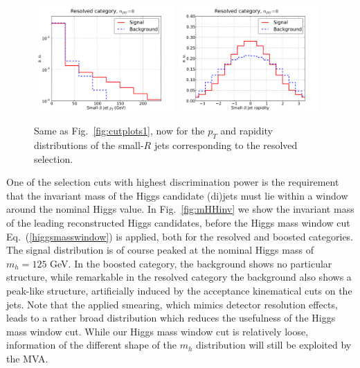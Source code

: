 \begin{figure}[t]
\begin{center}
 \includegraphics[width=0.48\textwidth]{plots/pt_smallRjets_res_noPU.pdf}
 \includegraphics[width=0.48\textwidth]{plots/eta_smallRjets_res_noPU.pdf}
 \caption{\small Same as Fig.~\ref{fig:cutplots1}, now for the
   $p_T$ and rapidity distributions of the small-$R$
   jets corresponding to the resolved selection.
}
\label{fig:cutplots23}
\end{center}
\end{figure}

One of the selection cuts with highest discrimination power is the requirement
that the invariant mass of the Higgs candidate (di)jets must lie within a window
around the nominal Higgs value.
%
In Fig.~\ref{fig:mHHinv} we show the invariant mass
of the leading reconstructed Higgs candidates, before the Higgs mass window
cut Eq.~(\ref{higgsmasswindow})
  is applied, both for the resolved and boosted categories.
%
The signal distribution is of course peaked at the
nominal Higgs mass of $m_h=125$ GeV.
%
In the boosted category, the background shows no particular
structure, while remarkable in the resolved category the background
also shows a peak-like structure, artificially induced by the
acceptance kinematical cuts on the jets.
%
Note that the applied smearing, which mimics detector resolution effects,
leads to a rather broad distribution which reduces the usefulness
of the Higgs mass window cut.
%
While our Higgs mass window cut is relatively loose,
information of the different shape of the $m_{h}$
distribution will still be exploited by the MVA.
%

